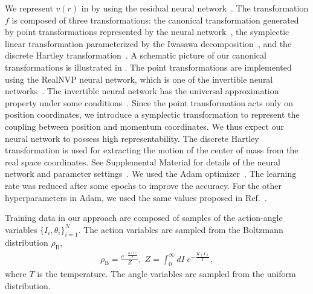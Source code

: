 We represent $v(r)$ in  by using the residual neural network~\cite{He-etal2016,Sehanobish-etal2020}.
The transformation $f$ is composed of three transformations: the canonical transformation generated by point transformations represented by the neural network~\cite{Shuo-Hui-etal2020}, the symplectic linear transformation parameterized by the Iwasawa decomposition~\cite{Bondesan-Lamacraft2019,Iwasawa1949}, and the discrete Hartley transformation~\cite{Hartley1942,Bracewell1983}.
A schematic picture of our canonical transformations is illustrated in .
The point transformations are implemented using the RealNVP neural network, which is one of the invertible neural networks~\cite{RealNVP2017}.
The invertible neural network has the universal approximation property under some conditions~\cite{Teshima-et-al2020}.
Since the point transformation acts only on position coordinates, we introduce a
symplectic transformation to represent the coupling between position
and momentum coordinates. We thus expect our neural network to
possess high representability.
The discrete Hartley transformation is used for extracting the motion of the center of mass from the real space coordinates.
See Supplemental Material for details of the neural network and parameter settings~\cite{our_supplemental_material}.
We used the Adam optimizer~\cite{Adam2017}.
The learning rate was reduced after some epochs to improve the accuracy.
For the other hyperparameters in Adam, we used the same values proposed in Ref.~.

Training data in our approach are composed of samples of the action-angle variables $\{I_i,\theta_i\}_{i=1}^{N}$.
The action variables are sampled from the Boltzmann distribution $\rho_{\mathrm{B}}$,
\begin{align}
  \rho_{\mathrm{B}} = \frac{e^{-\frac{K(I)}{T}}}{Z}, \; Z = \int_0^{\infty} dI \;e^{-\frac{K(I)}{T}},
\end{align}
where $T$ is the temperature.
The angle variables are sampled from the uniform distribution.

